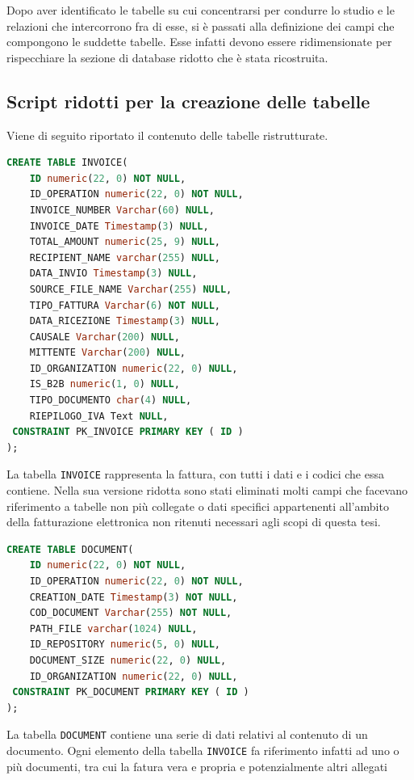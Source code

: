 \noindent Dopo aver identificato le tabelle su cui concentrarsi per condurre lo studio e le relazioni che intercorrono fra di esse, si è passati alla definizione dei campi che compongono le suddette tabelle. Esse infatti devono essere ridimensionate per rispecchiare la sezione di database ridotto che è stata ricostruita.\\

\subsection{Script ridotti per la creazione delle tabelle}
Viene di seguito riportato il contenuto delle tabelle ristrutturate.\\

\begin{lstlisting}[language=SQL,
        deletekeywords={IDENTITY,INT},
        morekeywords={clustered},    
        framesep=10pt,
        framextopmargin=10pt, style=sql_style]
CREATE TABLE INVOICE(
    ID numeric(22, 0) NOT NULL,
    ID_OPERATION numeric(22, 0) NOT NULL,
    INVOICE_NUMBER Varchar(60) NULL,
    INVOICE_DATE Timestamp(3) NULL,
    TOTAL_AMOUNT numeric(25, 9) NULL,
    RECIPIENT_NAME varchar(255) NULL,
    DATA_INVIO Timestamp(3) NULL,
    SOURCE_FILE_NAME Varchar(255) NULL,
    TIPO_FATTURA Varchar(6) NOT NULL,
    DATA_RICEZIONE Timestamp(3) NULL,
    CAUSALE Varchar(200) NULL,
    MITTENTE Varchar(200) NULL,
    ID_ORGANIZATION numeric(22, 0) NULL,
    IS_B2B numeric(1, 0) NULL,
    TIPO_DOCUMENTO char(4) NULL,
    RIEPILOGO_IVA Text NULL,
 CONSTRAINT PK_INVOICE PRIMARY KEY ( ID )
);
\end{lstlisting}
\noindent La tabella \texttt{INVOICE} rappresenta la fattura, con tutti i dati e i codici che essa contiene. Nella sua versione ridotta sono stati eliminati molti campi che facevano riferimento a tabelle non più collegate o dati specifici appartenenti all'ambito della fatturazione elettronica non ritenuti necessari agli scopi di questa tesi.\\

\begin{lstlisting}[language=SQL,
        deletekeywords={IDENTITY,INT},
        morekeywords={clustered},    
        framesep=10pt,
        framextopmargin=10pt, style=sql_style]
CREATE TABLE DOCUMENT(
    ID numeric(22, 0) NOT NULL,
    ID_OPERATION numeric(22, 0) NOT NULL,
    CREATION_DATE Timestamp(3) NOT NULL,
    COD_DOCUMENT Varchar(255) NOT NULL,
    PATH_FILE varchar(1024) NULL,
    ID_REPOSITORY numeric(5, 0) NULL,
    DOCUMENT_SIZE numeric(22, 0) NULL,
    ID_ORGANIZATION numeric(22, 0) NULL,
 CONSTRAINT PK_DOCUMENT PRIMARY KEY ( ID )
);
\end{lstlisting}
\noindent La tabella \texttt{DOCUMENT} contiene una serie di dati relativi al contenuto di un documento. Ogni elemento della tabella \texttt{INVOICE} fa riferimento infatti ad uno o più documenti, tra cui la fatura vera e propria e potenzialmente altri allegati\\

